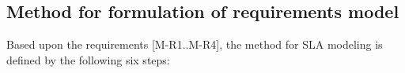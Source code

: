 \subsection{Method for formulation of requirements model}\label{susec:reqmodform}



Based upon the requirements [M-R1..M-R4], the method for SLA modeling is defined by the following six steps:

